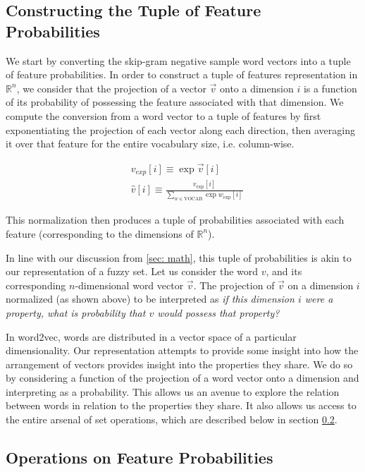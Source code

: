 \documentclass[11pt]{book}
\begin{document}
\subsection{Constructing the Tuple of Feature Probabilities} \label{ssec:
constructing}

We start by converting the skip-gram negative sample word vectors into a tuple
of feature probabilities. In order to construct a tuple of features
representation in $\mathbb{R}^n$, we consider that the projection of a vector
$\vec v$ onto a dimension $i$ is a function of its probability of possessing
the feature associated with that dimension.  We compute the conversion from a
word vector to a tuple of features by first exponentiating the projection of
each vector along each direction, then averaging it over that feature for the
entire vocabulary size, i.e. column-wise.

\begin{align*} & v_{exp}[i] \equiv \exp \vec v[i] \\ & \hat v[i]
\equiv \frac{v_{\text{exp}}[i]}{\sum_{w \in \text{VOCAB}} \exp
w_{\text{exp}}[i]} \end{align*}

This normalization then produces a tuple of probabilities associated with each
feature (corresponding to the dimensions of $\mathbb{R}^n$).

In line with our discussion from \ref{sec: math}, this tuple of probabilities
is akin to our representation of a fuzzy set. Let us consider the word $v$, and
its corresponding $n$-dimensional word vector $\vec v$. The projection of $\vec
v$ on a dimension $i$ normalized (as shown above) to be interpreted as
\textit{if this dimension $i$ were a property, what is probability that $v$
would possess that property?}

In word2vec, words are distributed in a vector space of a particular
dimensionality. Our representation attempts to provide some insight into how
the arrangement of vectors provides insight into the properties they share. We
do so by considering a function of the projection of a word vector onto a
dimension and interpreting as a probability. This allows us an avenue to
explore the relation between words in relation to the properties they share. It
also allows us access to the entire arsenal of set operations, which are
described below in section \ref{ssec: set operations}.

\subsection{Operations on Feature Probabilities} \label{ssec: set operations}
\end{document}

